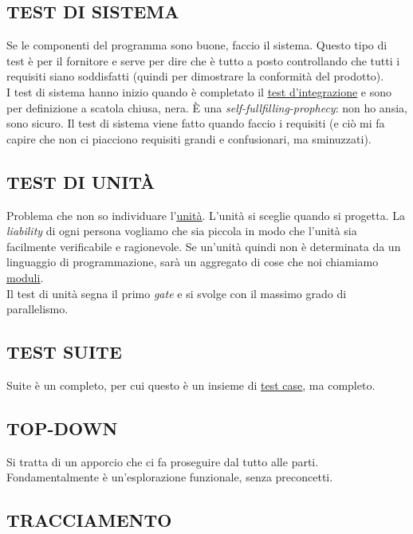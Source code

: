 		\subsection{TEST DI SISTEMA}		\label{testsistema}
		Se le componenti del programma sono buone, faccio il sistema. Questo tipo di test è per il fornitore e serve per dire che è tutto a posto controllando che tutti i requisiti siano soddisfatti (quindi per dimostrare la conformità del prodotto).	\\
		I test di sistema hanno inizio quando è completato il \underline{\hyperref[testintegrazione]{test d'integrazione}} e sono per definizione a scatola chiusa, nera.
		È una \textit{self-fullfilling-prophecy}: non ho ansia, sono sicuro.
		Il test di sistema viene fatto quando faccio i requisiti (e ciò mi fa capire che non ci piacciono requisiti grandi e confusionari, ma sminuzzati).


		\subsection{TEST DI UNITÀ}		\label{testunita}
		Problema che non so individuare l'\underline{\hyperref[unita]{unità}}. L'unità si sceglie quando si progetta. La \textit{liability} di ogni persona vogliamo che sia piccola in modo che l'unità sia facilmente verificabile e ragionevole. Se un'unità quindi non è determinata da un linguaggio di programmazione, sarà un aggregato di cose che noi chiamiamo \underline{\hyperref[moduli]{moduli}}.	\\
		Il test di unità segna il primo \textit{gate} e si svolge con il massimo grado di parallelismo.


		\subsection{TEST SUITE}		\label{testsuite}
		Suite è un completo, per cui questo è un insieme di \underline{\hyperref[testcase]{test case}}, ma completo.


		\subsection{TOP-DOWN}	 \label{topdown}
		Si tratta di un apporcio che ci fa proseguire dal tutto alle parti. Fondamentalmente è un'esplorazione funzionale, senza preconcetti.


		\subsection{TRACCIAMENTO}  \label{tracciamento}

